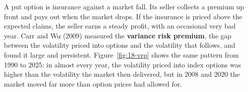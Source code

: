 A put option is insurance against a market fall. Its seller collects a premium up front and pays out when the market drops. If the insurance is priced above the expected claims, the seller earns a steady profit, with an occasional very bad year. Carr and Wu (2009) measured the \textbf{variance risk premium}, the gap between the volatility priced into options and the volatility that follows, and found it large and persistent. Figure~\ref{fig:18-vrp} shows the same pattern from 1990 to 2025: in almost every year, the volatility priced into index options was higher than the volatility the market then delivered, but in 2008 and 2020 the market moved far more than option prices had allowed for.

